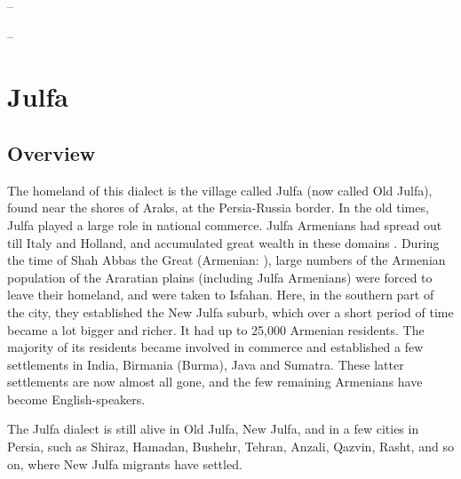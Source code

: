 – 

– 




\chapter{Julfa} \label{chapter:Julfa}

\begin{adjarianpage}\label{page:87}\end{adjarianpage}%

\section{Overview}

The homeland of this dialect is the village called Julfa (now called Old Julfa), found near the shores of Araks, at the Persia-Russia border. In the old times, Julfa played a large role in national commerce. Julfa Armenians had spread out till  Italy and Holland, and accumulated great wealth in these domains . During the time of Shah Abbas the Great (Armenian: ), large numbers of the Armenian population of the Araratian plains (including Julfa Armenians) were forced to leave their homeland, and were taken to Isfahan. Here, in the southern part of the city, they established the New Julfa suburb, which over a short period of time became a lot bigger and richer. It had up to 25,000 Armenian residents. The majority of its residents became involved in commerce and established a few settlements in India, Birmania (Burma), Java and Sumatra. These latter settlements are now almost all gone, and the few remaining Armenians have become English-speakers. 

The Julfa dialect is still alive in Old Julfa, New Julfa, and in a few cities in Persia, such as Shiraz, Hamadan, Bushehr, Tehran, Anzali, Qazvin, Rasht, and so on, where New Julfa migrants have settled. 

